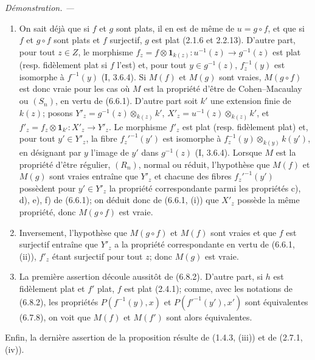\documentclass[10pt,oneside]{book}
\newcommand{\oldpage}[2][]{%
  \setcounter{footnote}{0}%
  \marginpar{\scriptsize\textbf{#1}~|~#2}\ignorespaces}
\newenvironment{proof}{%
  \par\medskip\noindent\textit{Démonstration. ---\ }}{\par}
\begin{document}
\begin{proof}
\oldpage[IV-2]{152}
\begin{enumerate}
\item[(i)] On sait déjà que si $f$ et $g$ sont plats, il en est de même de
$u=g\circ f$, et que si $f$ et $g\circ f$ sont plats et $f$ surjectif, $g$ est
plat (2.1.6 et 2.2.13). D'autre part, pour tout $z\in Z$, le morphisme
$f_z=f\otimes\mathbf 1_{k(z)}:u^{-1}(z)\to g^{-1}(z)$ est plat (resp.
fidèlement plat si $f$ l'est) et, pour tout $y\in g^{-1}(z)$,
$f_z^{-1}(y)$ est isomorphe à $f^{-1}(y)$ (I, 3.6.4). Si $M(f)$ et $M(g)$
sont vraies, $M(g\circ f)$ est donc vraie pour les cas où $M$ est la propriété
d'être de Cohen--Macaulay ou $(S_n)$, en vertu de (6.6.1). D'autre part soit
$k'$ une extension finie de $k(z)$; posons
$Y'_z=g^{-1}(z)\otimes_{k(z)}k'$, $X'_z=u^{-1}(z)\otimes_{k(z)}k'$, et
$f'_z=f_z\otimes\mathbf 1_{k'}:X'_z\to Y'_z$. Le morphisme $f'_z$ est plat
(resp. fidèlement plat) et, pour tout $y'\in Y'_z$, la fibre $f_z'^{-1}(y')$
est isomorphe à $f_z^{-1}(y)\otimes_{k(y)}k(y')$, en désignant par $y$ l'image
de $y'$ dans $g^{-1}(z)$ (I, 3.6.4). Lorsque $M$ est la propriété d'être
régulier, $(R_n)$, normal ou réduit, l'hypothèse que $M(f)$ et $M(g)$ sont
vraies entraîne que $Y'_z$ et chacune des fibres $f_z'^{-1}(y')$ possèdent
pour $y'\in Y'_z$ la propriété correspondante parmi les propriétés c), d),
e), f) de (6.6.1); on déduit donc de (6.6.1, (i)) que $X'_z$ possède la même
propriété, donc $M(g\circ f)$ est vraie.
\item[(ii)] Inversement, l'hypothèse que $M(g\circ f)$ et $M(f)$ sont vraies
et que $f$ est surjectif entraîne que $Y'_z$ a la propriété correspondante en
vertu de (6.6.1, (ii)), $f'_z$ étant surjectif pour tout $z$; donc $M(g)$ est
vraie.
\item[(iii)] La première assertion découle aussitôt de (6.8.2). D'autre part,
si $h$ est fidèlement plat et $f'$ plat, $f$ est plat (2.4.1); comme, avec les
notations de (6.8.2), les propriétés $P(f^{-1}(y),x)$ et
$P(f'^{-1}(y'),x')$ sont équivalentes (6.7.8), on voit que $M(f)$ et $M(f')$
sont alors équivalentes.
\end{enumerate}
Enfin, la dernière assertion de la proposition résulte de (1.4.3, (iii)) et
de (2.7.1, (iv)).
\end{proof}
\end{document}
